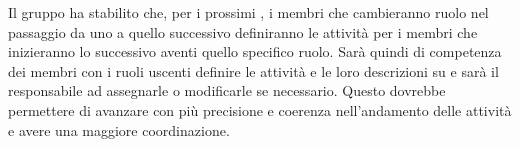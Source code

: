 Il gruppo ha stabilito che, per i prossimi , i membri che cambieranno ruolo nel passaggio da uno  a quello successivo definiranno le attività per i membri che inizieranno lo  successivo aventi quello specifico ruolo. Sarà quindi di competenza dei membri con i ruoli uscenti definire le attività e le loro descrizioni su  e sarà il responsabile ad assegnarle o modificarle se necessario. Questo dovrebbe permettere di avanzare con più precisione e coerenza nell'andamento delle attività e avere una maggiore coordinazione.
